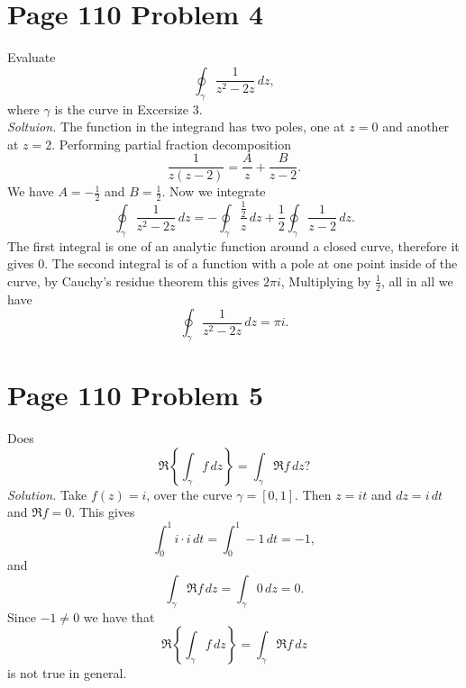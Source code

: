 \documentclass[12pt]{article}
\begin{document}
\section*{Page 110 Problem 4} Evaluate
\[
    \oint_{\gamma}\frac{1}{z^2-2z}\,dz,
\]
where $\gamma$ is the curve in Excersize 3.\\
\textit{Soltuion.} The function in the integrand has two poles, one at $z=0$ and another at $z=2$. Performing partial fraction decomposition
\[
    \frac{1}{z(z-2)}=\frac{A}{z}+\frac{B}{z-2}.
\]
We have $A=-\frac{1}{2}$ and $B=\frac{1}{2}$. Now we integrate
\[
    \oint_{\gamma}\frac{1}{z^2-2z}\,dz=-\oint_{\gamma}\frac{\frac{1}{2}}{z}\,dz+\frac{1}{2}\oint_{\gamma}\frac{1}{z-2}\,dz.
\]
The first integral is one of an analytic function around a closed curve, therefore it gives 0. The second integral is of a function with a pole at one point inside of the curve, by Cauchy's residue theorem this gives $2\pi i$, Multiplying by $\frac{1}{2}$, all in all we have
\[
    \oint_{\gamma}\frac{1}{z^2-2z}\,dz=\pi i.
\]
\section*{Page 110 Problem 5} Does
\[
    \Re\left\{\int_{\gamma}f\,dz\right\}=\int_{\gamma}\Re f\,dz?
\]
\textit{Solution.} Take $f(z)=i$, over the curve $\gamma=[0,1]$. Then $z=it$ and $dz=i\,dt$ and $\Re f=0$. This gives
\[
    \int_{0}^{1}i\cdot i\,dt=\int_{0}^{1}-1\,dt=-1,
\]
and 
\[
    \int_{\gamma}\Re f\,dz=\int_{\gamma}0\,dz=0.
\]
Since $-1\neq0$ we have that
\[
    \Re\left\{\int_{\gamma}f\,dz\right\}=\int_{\gamma}\Re f\,dz
\] 
is not true in general.

\end{document}
